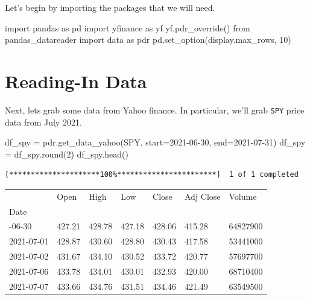 \documentclass[
  letterpaper,
  DIV=11,
  numbers=noendperiod]{scrreprt}
\newenvironment{Shaded}{\begin{snugshade}}{\end{snugshade}}
\newcommand{\BuiltInTok}[1]{\textcolor[rgb]{0.00,0.23,0.31}{#1}}
\newcommand{\DecValTok}[1]{\textcolor[rgb]{0.68,0.00,0.00}{#1}}
\newcommand{\ImportTok}[1]{\textcolor[rgb]{0.00,0.46,0.62}{#1}}
\newcommand{\NormalTok}[1]{\textcolor[rgb]{0.00,0.23,0.31}{#1}}
\newcommand{\OperatorTok}[1]{\textcolor[rgb]{0.37,0.37,0.37}{#1}}
\newcommand{\StringTok}[1]{\textcolor[rgb]{0.13,0.47,0.30}{#1}}
\begin{document}
Let's begin by importing the packages that we will need.

\begin{Shaded}
\begin{Highlighting}[]
\ImportTok{import}\NormalTok{ pandas }\ImportTok{as}\NormalTok{ pd}
\ImportTok{import}\NormalTok{ yfinance }\ImportTok{as}\NormalTok{ yf}
\NormalTok{yf.pdr\_override()}
\ImportTok{from}\NormalTok{ pandas\_datareader }\ImportTok{import}\NormalTok{ data }\ImportTok{as}\NormalTok{ pdr}
\NormalTok{pd.set\_option(}\StringTok{\textquotesingle{}display.max\_rows\textquotesingle{}}\NormalTok{, }\DecValTok{10}\NormalTok{)}
\end{Highlighting}
\end{Shaded}

\hypertarget{reading-in-data-1}{%
\section{Reading-In Data}\label{reading-in-data-1}}

Next, lets grab some data from Yahoo finance. In particular, we'll grab
\texttt{SPY} price data from July 2021.

\begin{Shaded}
\begin{Highlighting}[]
\NormalTok{df\_spy }\OperatorTok{=}\NormalTok{ pdr.get\_data\_yahoo(}\StringTok{\textquotesingle{}SPY\textquotesingle{}}\NormalTok{, start}\OperatorTok{=}\StringTok{\textquotesingle{}2021{-}06{-}30\textquotesingle{}}\NormalTok{, end}\OperatorTok{=}\StringTok{\textquotesingle{}2021{-}07{-}31\textquotesingle{}}\NormalTok{)}
\NormalTok{df\_spy }\OperatorTok{=}\NormalTok{ df\_spy.}\BuiltInTok{round}\NormalTok{(}\DecValTok{2}\NormalTok{)}
\NormalTok{df\_spy.head()}
\end{Highlighting}
\end{Shaded}

\begin{verbatim}
[*********************100%***********************]  1 of 1 completed
\end{verbatim}

\begin{longtable}[]{@{}lllllll@{}}
\toprule\noalign{}
& Open & High & Low & Close & Adj Close & Volume \\
Date & & & & & & \\
\midrule\noalign{}
\endhead
\bottomrule\noalign{}
\endlastfoot
2021-06-30 & 427.21 & 428.78 & 427.18 & 428.06 & 415.28 & 64827900 \\
2021-07-01 & 428.87 & 430.60 & 428.80 & 430.43 & 417.58 & 53441000 \\
2021-07-02 & 431.67 & 434.10 & 430.52 & 433.72 & 420.77 & 57697700 \\
2021-07-06 & 433.78 & 434.01 & 430.01 & 432.93 & 420.00 & 68710400 \\
2021-07-07 & 433.66 & 434.76 & 431.51 & 434.46 & 421.49 & 63549500 \\
\end{longtable}
\end{document}

